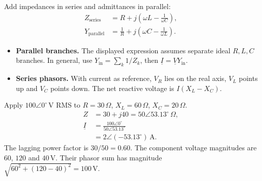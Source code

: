 \documentclass[12pt,a4paper]{article}
\begin{document}
Add impedances in series and admittances in parallel:
\[
\begin{aligned}
Z_{\mathrm{series}}&=R+j\left(\omega L-\frac{1}{\omega C}\right),\\
Y_{\mathrm{parallel}}&=\frac{1}{R}
       +j\left(\omega C-\frac{1}{\omega L}\right).
\end{aligned}
\]
\begin{itemize}[leftmargin=*, itemsep=3pt, topsep=4pt]
  \item \textbf{Parallel branches.} The displayed expression assumes separate ideal \(R,L,C\) branches. In general, use \(Y_{\mathrm{in}}=\sum_k 1/Z_k\), then \(\underline I=\underline VY_{\mathrm{in}}\).
  \item \textbf{Series phasors.} With current as reference, \(V_R\) lies on the real axis, \(V_L\) points up and \(V_C\) points down. The net reactive voltage is \(I(X_L-X_C)\).
\end{itemize}

\begin{tcolorbox}[tikzbox,title={Series RLC phasors for a net inductive load},unbreakable]
\centering
{}
\end{tcolorbox}

\begin{tcolorbox}[examplebox,title={Solving a series RLC circuit}]
Apply \(100\angle0^\circ\,\mathrm V\) RMS to \(R=30\,\Omega\), \(X_L=60\,\Omega\), \(X_C=20\,\Omega\).
\[
\begin{aligned}
Z&=30+j40=50\angle53.13^\circ\,\Omega,\\
\underline I&=\frac{100\angle0^\circ}{50\angle53.13^\circ}\\
             &=2\angle(-53.13^\circ)\,\mathrm A.
\end{aligned}
\]
The lagging power factor is \(30/50=0.60\). The component voltage magnitudes are \(60\), \(120\) and \(40\,\mathrm V\). Their phasor sum has magnitude \(\sqrt{60^2+(120-40)^2}=100\,\mathrm V\).
\end{tcolorbox}
\end{document}
